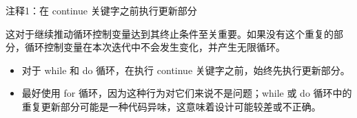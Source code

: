 

{\footnotesize
注释1：在 continue 关键字之前执行更新部分
}

这对于继续推动循环控制变量达到其终止条件至关重要。如果没有这个重复的部分，循环控制变量在本次迭代中不会发生变化，并产生无限循环。


\begin{itemize}
\item
对于 while 和 do 循环，在执行 continue 关键字之前，始终先执行更新部分。

\item
最好使用 for 循环，因为这种行为对它们来说不是问题；while 或 do 循环中的重复更新部分可能是一种代码异味，这意味着设计可能较差或不正确。
\end{itemize}
